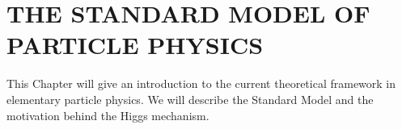 
\chapter{THE STANDARD MODEL OF PARTICLE PHYSICS}





This Chapter will give an introduction to the current theoretical framework in elementary particle physics.  We will describe the Standard Model and the motivation behind the Higgs mechanism.


